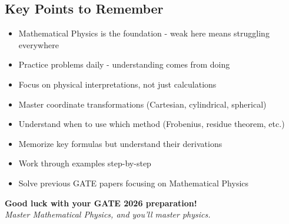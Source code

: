 \documentclass[12pt,a4paper]{article}
\begin{document}
\subsection{Key Points to Remember}
\begin{itemize}
    \item Mathematical Physics is the foundation - weak here means struggling everywhere
    \item Practice problems daily - understanding comes from doing
    \item Focus on physical interpretations, not just calculations
    \item Master coordinate transformations (Cartesian, cylindrical, spherical)
    \item Understand when to use which method (Frobenius, residue theorem, etc.)
    \item Memorize key formulas but understand their derivations
    \item Work through examples step-by-step
    \item Solve previous GATE papers focusing on Mathematical Physics
\end{itemize}

\vspace{2cm}
\begin{center}
\textbf{Good luck with your GATE 2026 preparation!}\\
\textit{Master Mathematical Physics, and you'll master physics.}
\end{center}
\end{document}
